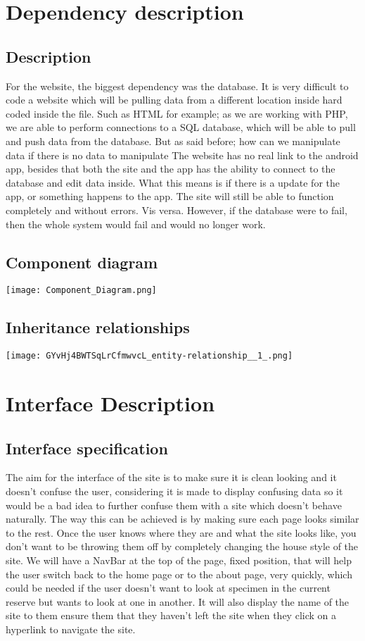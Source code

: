 \documentclass[12pt]{article}
\begin{document}
\section{Dependency description}

  \subsection{Description}
    For the website, the biggest dependency was the database. It is very difficult to code a website which will be pulling data from a different location inside hard coded inside the file. Such as HTML for example; as we are working with PHP, we are able to perform connections to a SQL database, which will be able to pull and push data from the database. But as said before; how can we manipulate data if there is no data to manipulate
The website has no real link to the android app, besides that both the site and the app has the ability to connect to the database and edit data inside. What this means is if there is a update for the app, or something happens to the app. The site will still be able to function completely and without errors. Vis versa. However, if the database were to fail, then the whole system would fail and would no longer work.

    \subsection{Component diagram}
    \texttt{[image: Component\_Diagram.png]}

  \subsection{Inheritance relationships}
  \texttt{[image: GYvHj4BWTSqLrCfmwvcL\_entity-relationship\_\_1\_.png]}

\section{Interface Description}

  \subsection{Interface specification}
    The aim for the interface of the site is to make sure it is clean looking and it doesn’t confuse the user, considering it is made to display confusing data so it would be a bad idea to further confuse them with a site which doesn’t behave naturally. The way this can be achieved is by making sure each page looks similar to the rest. Once the user knows where they are and what the site looks like, you don’t want to be throwing them off by completely changing the house style of the site.
We will have a NavBar at the top of the page, fixed position, that will help the user switch back to the home page or to the about page, very quickly, which could be needed if the user doesn’t want to look at specimen in the current reserve but wants to look at one in another. It will also display the name of the site to them ensure them that they haven’t left the site when they click on a hyperlink to navigate the site.
\end{document}
